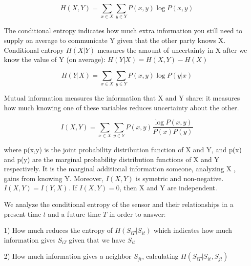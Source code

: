 \documentclass[final,a4paper]{llncs}
\begin{document}
\begin{equation}\label{eq:joint-entropy}
H(X,Y)= \sum_{x\in X}\sum_{y\in Y}P(x,y)\log P(x,y)
\end{equation}



The conditional entropy indicates how much extra information you
still need to supply on average to communicate Y given that the
other party knows X. Conditional entropy $H (X|Y)$ measures the amount of uncertainty in
X after we know the value of Y (on average):
$H(Y|X)=H(X,Y)-H(X)$

\begin{equation}
H(Y|X)= \sum_{x\in X}\sum_{y\in Y}P(x,y)\log P(y|x)
\end{equation}

Mutual information measures the information that X and Y share:
it measures how much knowing one of these variables reduces uncertainty
about the other.
%

\begin{equation}
I(X,Y)= \sum_{x\in X}\sum_{y\in Y}P(x,y)\frac{\log P(x,y)}{P(x)P(y)}
\end{equation}

where p(x,y) is the joint probability distribution function of X and Y, 
and p(x) and p(y) are the marginal probability distribution functions of X 
and Y respectively. It is the marginal additional information someone, 
analyzing X ,
gains from knowing Y.
Moreover, $I(X,Y)$ is symetric and non-negative.
 $I(X,Y)=I(Y,X) $. If $I(X,Y)=0$, then X and Y are independent.
 
 
We analyze the conditional entropy of the sensor and their relationships in a 
present time $t$ and a future time $T$ in order to answer:

1) How much reduces the entropy of $H(S_{iT}|S_{it})$ which indicates
how much information gives  $S_{iT}$ given that we have $S_{it}$

2) How much information gives a neighbor $S_{jt}$, calculating $H(S_{iT}|S_{it},S_{jt})$

\end{document}
